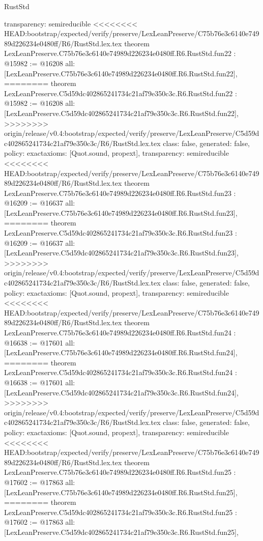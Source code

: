 \begin{lexlean}{RustStd}
\begin{coremodule}
{\begin{coremodule}
{{{{{{{{{{{{{{{{{{{{{{{{{  transparency: semireducible
}
<<<<<<<< HEAD:bootstrap/expected/verify/preserve/LexLeanPreserve/C75b76e3c6140e74989d226234e0480ff/R6/RustStd.lex.tex
theorem LexLeanPreserve.C75b76e3c6140e74989d226234e0480ff.R6.RustStd.fun22 : @15982 := @16208 {
  all: [LexLeanPreserve.C75b76e3c6140e74989d226234e0480ff.R6.RustStd.fun22],
========
theorem LexLeanPreserve.C5d59dc402865241734c21af79e350c3c.R6.RustStd.fun22 : @15982 := @16208 {
  all: [LexLeanPreserve.C5d59dc402865241734c21af79e350c3c.R6.RustStd.fun22],
>>>>>>>> origin/release/v0.4:bootstrap/expected/verify/preserve/LexLeanPreserve/C5d59dc402865241734c21af79e350c3c/R6/RustStd.lex.tex
  class: false,
  generated: false,
  policy: exact{axioms: [Quot.sound, propext]},
  transparency: semireducible
}
<<<<<<<< HEAD:bootstrap/expected/verify/preserve/LexLeanPreserve/C75b76e3c6140e74989d226234e0480ff/R6/RustStd.lex.tex
theorem LexLeanPreserve.C75b76e3c6140e74989d226234e0480ff.R6.RustStd.fun23 : @16209 := @16637 {
  all: [LexLeanPreserve.C75b76e3c6140e74989d226234e0480ff.R6.RustStd.fun23],
========
theorem LexLeanPreserve.C5d59dc402865241734c21af79e350c3c.R6.RustStd.fun23 : @16209 := @16637 {
  all: [LexLeanPreserve.C5d59dc402865241734c21af79e350c3c.R6.RustStd.fun23],
>>>>>>>> origin/release/v0.4:bootstrap/expected/verify/preserve/LexLeanPreserve/C5d59dc402865241734c21af79e350c3c/R6/RustStd.lex.tex
  class: false,
  generated: false,
  policy: exact{axioms: [Quot.sound, propext]},
  transparency: semireducible
}
<<<<<<<< HEAD:bootstrap/expected/verify/preserve/LexLeanPreserve/C75b76e3c6140e74989d226234e0480ff/R6/RustStd.lex.tex
theorem LexLeanPreserve.C75b76e3c6140e74989d226234e0480ff.R6.RustStd.fun24 : @16638 := @17601 {
  all: [LexLeanPreserve.C75b76e3c6140e74989d226234e0480ff.R6.RustStd.fun24],
========
theorem LexLeanPreserve.C5d59dc402865241734c21af79e350c3c.R6.RustStd.fun24 : @16638 := @17601 {
  all: [LexLeanPreserve.C5d59dc402865241734c21af79e350c3c.R6.RustStd.fun24],
>>>>>>>> origin/release/v0.4:bootstrap/expected/verify/preserve/LexLeanPreserve/C5d59dc402865241734c21af79e350c3c/R6/RustStd.lex.tex
  class: false,
  generated: false,
  policy: exact{axioms: [Quot.sound, propext]},
  transparency: semireducible
}
<<<<<<<< HEAD:bootstrap/expected/verify/preserve/LexLeanPreserve/C75b76e3c6140e74989d226234e0480ff/R6/RustStd.lex.tex
theorem LexLeanPreserve.C75b76e3c6140e74989d226234e0480ff.R6.RustStd.fun25 : @17602 := @17863 {
  all: [LexLeanPreserve.C75b76e3c6140e74989d226234e0480ff.R6.RustStd.fun25],
========
theorem LexLeanPreserve.C5d59dc402865241734c21af79e350c3c.R6.RustStd.fun25 : @17602 := @17863 {
  all: [LexLeanPreserve.C5d59dc402865241734c21af79e350c3c.R6.RustStd.fun25],
}}}}}}}}}}}}}}}}}}}}}}}}}}}}}
\end{coremodule}}
\end{coremodule}
\end{lexlean}
